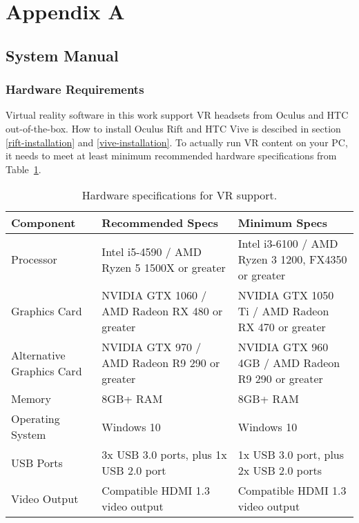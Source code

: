 \section*{Appendix A}
\subsection*{System Manual}

\subsubsection*{Hardware Requirements}\label{sec:hardware-req}

Virtual reality software in this work support VR headsets from Oculus and HTC out-of-the-box. How to install Oculus Rift and HTC Vive is descibed in section \ref{rift-installation} and \ref{vive-installation}. To actually run VR content on your PC, it needs to meet at least minimum recommended hardware specifications from Table~\ref{tab:vr-specs}.

\begin{table}[!ht]
	\centering\footnotesize
	{\renewcommand{\arraystretch}{1.1}%
		{\setlength{\tabcolsep}{0.5em}
	\begin{tabular}{ |p{3.8cm}||p{5cm}|p{5cm}| }
		\hline
		Component & Recommended Specs & Minimum Specs \\
		\hline
		Processor & Intel i5-4590 / AMD Ryzen 5 1500X or greater & Intel i3-6100 / AMD Ryzen 3 1200, FX4350 or greater  \\
		Graphics Card & NVIDIA GTX 1060 / AMD Radeon RX 480 or greater & NVIDIA GTX 1050 Ti / AMD Radeon RX 470 or greater  \\
		\hline
		Alternative Graphics Card & NVIDIA GTX 970 / AMD Radeon R9 290 or greater & NVIDIA GTX 960 4GB / AMD Radeon R9 290 or greater  \\
		\hline
		Memory & 8GB+ RAM & 8GB+ RAM  \\
		\hline
		Operating System & Windows 10 & Windows 10  \\
		\hline
		USB Ports & 3x USB 3.0 ports, plus 1x USB 2.0 port & 1x USB 3.0 port, plus 2x USB 2.0 ports  \\
		\hline
		Video Output & 	Compatible HDMI 1.3 video output & Compatible HDMI 1.3 video output  \\
		\hline
	\end{tabular}}}
	\caption{Hardware specifications for VR support.}
	\label{tab:vr-specs}
\end{table}

